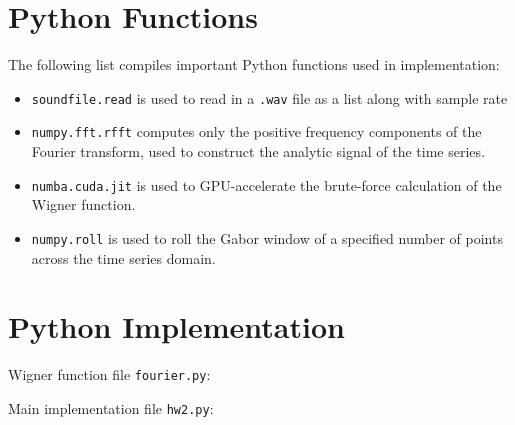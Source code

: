 \documentclass{article}
\begin{document}
\begin{appendices}
\newpage
\section{Python Functions}\label{functions}
The following list compiles important Python functions used in implementation:
\begin{itemize}
\item \texttt{soundfile.read} is used to read in a \texttt{.wav} file as a list along with sample rate
\item \texttt{numpy.fft.rfft} computes only the positive frequency components of the Fourier transform, used to construct the analytic signal of the time series.
\item \texttt{numba.cuda.jit} is used to GPU-accelerate the brute-force calculation of the Wigner function.
\item \texttt{numpy.roll} is used to roll the Gabor window of a specified number of points across the time series domain.
\end{itemize}

\section{Python Implementation}\label{implementation}
Wigner function file \texttt{fourier.py}:

\vspace{5cm}
Main implementation file \texttt{hw2.py}:


\end{appendices}
\end{document}
